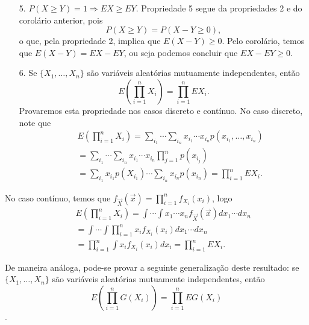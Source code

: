 %
\begin{frame}
%
%
\begin{itemize}
\item[5.] $P(X\geq Y)=1\Rightarrow EX\geq EY$.
Propriedade 5 segue da propriedades 2 e do corolário anterior, pois
$$P(X\geq Y)=P(X-Y\geq 0),$$
o que, pela propriedade 2, implica que $E(X-Y)\geq 0$. Pelo corolário, temos que $E(X-Y)=EX-EY$, ou seja podemos concluir
que $EX-EY\geq 0$.
%
\item[6.] Se $\{X_1,\ldots,X_n\}$ são variáveis aleatórias mutuamente
independentes, então $$E(\prod_{i=1}^{n}X_i)=\prod_{i=1}^{n}EX_i.$$
Provaremos esta propriedade nos casos discreto e contínuo. No caso discreto, note que
\begin{eqnarray}
& & E(\prod_{i=1}^{n}X_i)=\sum_{i_1}\cdots\sum_{i_n}x_{i_1}\cdots
x_{i_n}p(x_{i_1},\ldots,x_{i_n}) \nonumber \\
& & =\sum_{i_1}\cdots\sum_{i_n}x_{i_1}\cdots
x_{i_n}\prod_{j=1}^{n}p(x_{i_j})\nonumber\\
& & =\sum_{i_1}x_{i_1}p(X_{i_1})\cdots\sum_{i_n}
x_{i_n}p(x_{i_n})=\prod_{i=1}^n EX_i. \nonumber
\end{eqnarray}

\end{itemize}
%
\end{frame}
%
\begin{frame}
%
No caso contínuo, temos que $f_{\vec{X}}(\vec{x})=\prod_{i=1}^{n}f_{X_i}(x_i)$, logo
\begin{eqnarray}
& & E(\prod_{i=1}^{n}X_i)=\int\cdots\int x_1\cdots x_n f_{\vec{X}}(\vec{x})dx_1\cdots dx_n \nonumber \\
& &=\int\cdots\int \prod_{i=1}^{n}x_if_{X_i}(x_i)dx_1\cdots dx_n \nonumber \\
& & =\prod_{i=1}^{n}\int x_if_{X_i}(x_i)dx_i=\prod_{i=1}^n EX_i. \nonumber
\end{eqnarray}

De maneira análoga, pode-se provar a seguinte generalização deste resultado:
se $\{X_1,\ldots,X_n\}$ são variáveis aleatórias mutuamente
independentes, então $$E(\prod_{i=1}^{n}G(X_i))=\prod_{i=1}^{n}EG(X_i)$$.


\end{frame}
